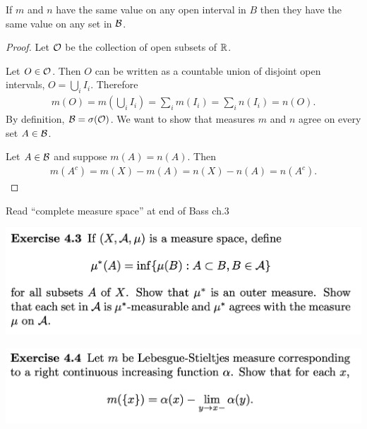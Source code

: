 \begin{claim*}
  If $m$ and $n$ have the same value on any open interval in $B$ then they have the same value on any set
  in $\mathcal B$.
\end{claim*}

\begin{proof}
  Let $\mathcal O$ be the collection of open subsets of $\mathbb{R}$.

  Let $O \in \mathcal O$. Then $O$ can be written as a countable union of disjoint open intervals, $O = \bigcup_i I_i$. Therefore
  \begin{align*}
    m(O) = m(\bigcup_i I_i) = \sum_i m(I_i) = \sum_i n(I_i) = n(O).
  \end{align*}
   By definition, $\mathcal B = \sigma(\mathcal O)$. We want to show that measures $m$ and $n$ agree on every set $A \in \mathcal B$.

   Let $A \in \mathcal B$ and suppose $m(A) = n(A)$. Then
   \begin{align*}
     m(A^c) = m(X) - m(A) = n(X) - n(A) = n(A^c).
   \end{align*}




\end{proof}
Read ``complete measure space​'' at end of Bass ch.3

\newpage
\begin{mdframed}
\includegraphics[width=400pt]{img/analysis--berkeley-202a-hw-0d98.png}
\end{mdframed}


\newpage
\begin{mdframed}
\includegraphics[width=400pt]{img/analysis--berkeley-202a-hw-e9e2.png}
\end{mdframed}
